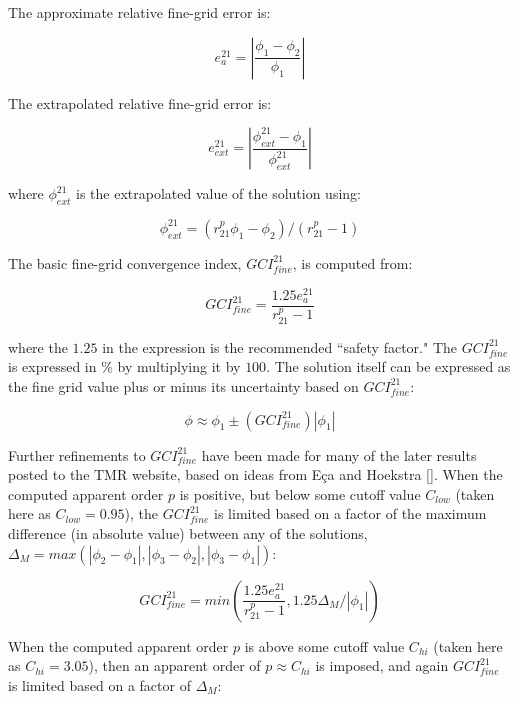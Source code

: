 \documentclass[handcarry]{aiaa-tc-mod}%
\begin{document}
The approximate relative fine-grid error is:

\begin{equation}
e_a^{21} = \left| \frac{\phi_1 - \phi_2}{\phi_1} \right|
\end{equation}

The extrapolated relative fine-grid error is:

\begin{equation}
e_{ext}^{21} = \left| \frac{\phi_{ext}^{21} - \phi_1}{\phi_{ext}^{21}} \right|
\end{equation}

\noindent where $\phi_{ext}^{21}$ is the extrapolated value of the solution using:

\begin{equation}
\phi_{ext}^{21} = (r_{21}^p \phi_1 - \phi_2) / (r_{21}^p - 1)
\end{equation}

The basic fine-grid convergence index, $GCI_{fine}^{21}$, is computed from:

\begin{equation}
GCI_{fine}^{21} = \frac{1.25 e_a^{21}}{r_{21}^p - 1}
\end{equation}

\noindent where the $1.25$ in the expression is the recommended ``safety factor."
The $GCI_{fine}^{21}$ is expressed in $\%$ by multiplying it by $100$.
The solution itself can be expressed as the fine
grid value plus or minus its uncertainty based on $GCI_{fine}^{21}$:

\begin{equation}
\phi \approx \phi_1 \pm (GCI_{fine}^{21}) |\phi_1|
\end{equation}

Further refinements to $GCI_{fine}^{21}$ have been made for many of the later
results posted to the TMR website, based on ideas from
E\c ca and Hoekstra [].
When the computed apparent order $p$ is positive, but below some cutoff value $C_{low}$
(taken here as $C_{low} = 0.95$),
the $GCI_{fine}^{21}$ is limited based on a factor of the maximum difference (in absolute value) between any of the
solutions, $\Delta_M = max (|\phi_2 - \phi_1|, |\phi_3 - \phi_2|, |\phi_3 - \phi_1|)$:

\begin{equation}
GCI_{fine}^{21} = min(\frac{1.25 e_a^{21}}{r_{21}^p - 1}, 1.25 \Delta_M/ |\phi_1|)
\end{equation}

\noindent When the computed apparent order $p$ is above some cutoff value $C_{hi}$
(taken here as $C_{hi} = 3.05$), then
an apparent order of $p \approx C_{hi}$ is imposed, and again $GCI_{fine}^{21}$ is limited based 
on a factor of $\Delta_M$:
\end{document}
